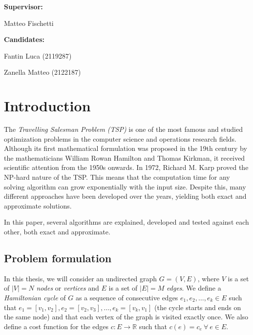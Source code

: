 \documentclass[12pt]{article}
\begin{document}
\begin{titlepage}
\begin{center}
\vspace{4cm}
\raggedright\textbf{\large Supervisor:} \\
\raggedright\large Matteo Fischetti\\
\vspace{2cm}
\raggedright\textbf{\large Candidates:} \\
\raggedright\large Fantin Luca (2119287)  \\
\raggedright\large Zanella Matteo (2122187)\\

\end{center}
\end{titlepage}

\tableofcontents
\listofalgorithms
\newpage

{}
\section*{\centering Introduction}\label{Introduction}

The \textit{Travelling Salesman Problem (TSP)} is one of the most famous and studied optimization problems in the computer science and operations research fields. Although its first mathematical formulation was proposed in the 19th century by the mathematicians William Rowan Hamilton and Thomas Kirkman, it received scientific attention from the 1950s onwards. In 1972, Richard M. Karp proved the NP-hard nature of the TSP. This means that the computation time for any solving algorithm can grow exponentially with the input size. Despite this, many different approaches have been developed over the years, yielding both exact and approximate solutions.

In this paper, several algorithms are explained, developed and tested against each other, both exact and approximate.

{}
\subsection*{Problem formulation}\label{Problem formulation}

In this thesis, we will consider an undirected graph $G=(V, E)$, where $V$ is a set of $|V|=N$ \textit{nodes} or \textit{vertices} and $E$ is a set of $|E|=M$ \textit{edges}. We define a \textit{Hamiltonian cycle} of $G$ as a sequence of consecutive edges $e_1, e_2, \ldots, e_k \in E$ such that $e_1=[v_1, v_2], e_2=[v_2, v_3], \ldots, e_k = [v_k, v_1]$ (the cycle starts and ends on the same node) and that each vertex of the graph is visited exactly once. We also define a cost function for the edges $c : E \rightarrow \mathbb{R}$ such that $c(e)=c_e \ \forall \ e\in E$.
\end{document}
